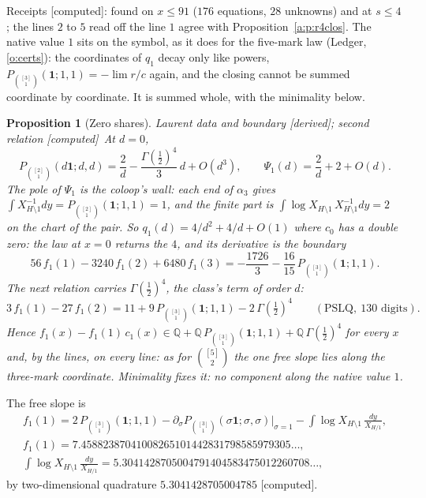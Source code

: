 \documentclass[11pt]{article}
\newcommand{\one}{\mathbf 1}
\newcommand{\Pth}{P_{\binom{[3]}1}(\one;1,1)}
\theoremstyle{plain}
\newtheorem{proposition}{Proposition}[section]
\theoremstyle{definition}
\theoremstyle{remark}
\newcommand{\derived}{\textup{[derived]}}
\newcommand{\computed}{\textup{[computed]}}
\begin{document}
\noindent Receipts \computed: found on $x\le91$ ($176$ equations, $28$ unknowns) and at $s\le4$; the lines $2$ to $5$ read off the line $1$ agree with Proposition~\ref{a:p:r4clos}. The native value $1$ sits on the symbol, as it does for the five-mark law (Ledger, \ref{o:certs}): the coordinates of $q_1$ decay only like powers, $\Pth=-\lim r/c$ again, and the closing cannot be summed coordinate by coordinate. It is summed whole, with the minimality below.

\begin{proposition}[Zero shares]\label{a:p:r4zero}Laurent data and boundary \derived; second relation \computed\
At $d=0$,
\[
P_{\binom{[2]}1}(d\one;d,d)=\frac2d-\frac{\Gamma(\frac12)^4}{3}\,d+O(d^3),\qquad \Psi_1(d)=\frac2d+2+O(d) .
\]
The pole of $\Psi_1$ is the coloop's wall: each end of $\alpha_3$ gives $\int X_{H\setminus1}^{-1}dy=P_{\binom{[2]}1}(\one;1,1)=1$, and the finite part is $\int\log X_{H\setminus1}\,X_{H\setminus1}^{-1}dy=2$ on the chart of the pair. So $q_1(d)=4/d^2+4/d+O(1)$ where $c_0$ has a double zero: the law at $x=0$ returns the $4$, and its derivative is the boundary
\[
56\,f_1(1)-3240\,f_1(2)+6480\,f_1(3)=-\frac{1726}3-\frac{16}{15}\,\Pth .
\]
The next relation carries $\Gamma(\frac12)^4$, the class's term of order $d$:
\[
3\,f_1(1)-27\,f_1(2)=11+9\,\Pth-2\,\Gamma(\tfrac12)^4\qquad(\text{PSLQ},\ 130\text{ digits}).
\]
Hence $f_1(x)-f_1(1)\,c_1(x)\in\mathbb Q+\mathbb Q\,\Pth+\mathbb Q\,\Gamma(\frac12)^4$ for every $x$ and, by the lines, on every line: as for $\binom{[5]}2$ the one free slope lies along the three-mark coordinate. Minimality fixes it: no component along the native value $1$.
\end{proposition}

\noindent The free slope is
\begin{gather*}
f_1(1)=2\,\Pth-\partial_\sigma P_{\binom{[3]}1}(\sigma\one;\sigma,\sigma)\big|_{\sigma=1}-\int\log X_{H\setminus1}\,\frac{dy}{X_{H/1}},\\
f_1(1)=7.45882387041008265101442831798585979305\ldots,\\
\int\log X_{H\setminus1}\,\frac{dy}{X_{H/1}}=5.3041428705004791404583475012260708\ldots,
\end{gather*}
by two-dimensional quadrature $5.3041428705004785$ \computed.
\end{document}

